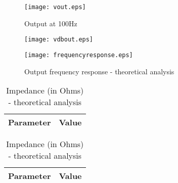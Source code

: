 \begin{figure}[h] \centering
\texttt{[image: vout.eps]}
\vspace{-5mm}
\caption{Output at 100Hz}
\label{fig:vout}
\end{figure}

\begin{figure}[h] \centering
  \begin{minipage}{.45\textwidth}
    \texttt{[image: vdbout.eps]}
    \caption{Output frequency response - theoretical analysis}
    \label{fig:vdbout}
  \end{minipage}%
    \hspace{2 mm}
  \begin{minipage}{.45\textwidth}
  \centering
    \texttt{[image: frequencyresponse.eps]}
    \caption{Output frequency response - theoretical analysis}
    \label{fig:compvdbout}
      \end{minipage}%
\end{figure}

\begin{table}[!htb]
  \begin{minipage}{.5\linewidth}
     \centering
  \begin{tabular}{|c|c|}
    \hline    
    {\bf Parameter} & {\bf Value} \\ \hline
    
    
 \end{tabular}
 \caption{Impedance (in Ohms) -  simulation analysis}
 \label{tab:z}
  \end{minipage}
    \hspace{2 mm}
    \begin{minipage}{.5\linewidth}
      \centering
        \begin{tabular}{|c|c|}
    \hline    
    {\bf Parameter} & {\bf Value} \\ \hline
     
 \end{tabular}
        \caption{Impedance (in Ohms) - theoretical analysis}
        \label{tab:compz}
    \end{minipage} 
\end{table}


\newpage
